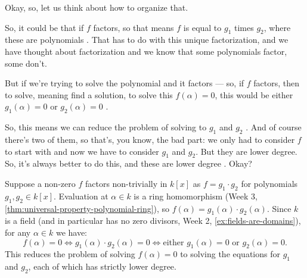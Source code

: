 \begin{speech}[00:49:35 - 00:51:15]
Okay, so, let us think about how to organize that.

So, it could be that if $f$ factors, so that means $f$ is equal to $g_1$ times $g_2$, where these are polynomials . That has to do with this unique factorization, and we have thought about factorization and we know that some polynomials factor, some don't.

But if we're trying to solve the polynomial and it factors --- so, if $f$ factors, then to solve, meaning find a solution, to solve this $f(\alpha) = 0$, this would be either $g_1(\alpha) = 0$ or $g_2(\alpha) = 0$ .

So, this means we can reduce the problem of solving to $g_1$ and $g_2$ . And of course there's two of them, so that's, you know, the bad part: we only had to consider $f$ to start with and now we have to consider $g_1$ and $g_2$. But they are lower degree. So, it's always better to do this, and these are lower degree . Okay?
\end{speech}

\begin{content}
Suppose a non-zero $f$ factors non-trivially in $k[x]$ as $f = g_1 \cdot g_2$ for polynomials $g_1, g_2 \in k[x]$. Evaluation at $\alpha \in k$ is a ring homomorphism (Week 3, \cref{thm:universal-property-polynomial-ring}), so $f(\alpha) = g_1(\alpha) \cdot g_2(\alpha)$. Since $k$ is a field (and in particular has no zero divisors, Week 2, \cref{ex:fields-are-domains}), for any $\alpha \in k$ we have:
\[
f(\alpha) = 0 \iff g_1(\alpha) \cdot g_2(\alpha) = 0 \iff \text{either } g_1(\alpha) = 0 \text{ or } g_2(\alpha) = 0.
\]
This reduces the problem of solving $f(\alpha) = 0$ to solving the equations for $g_1$ and $g_2$, each of which has strictly lower degree.
\end{content}

\begin{hidden}
\end{hidden}

